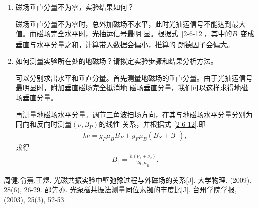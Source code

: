 \documentclass[11pt,a4paper]{article}
\begin{document}
\begin{spacing}{1.3}
\begin{CJK*}{UTF8}{gbsn}
\begin{enumerate}
\item  磁场垂直分量不为零，实验结果如何？\par 
磁场垂直分量不为零时，总外加磁场不水平，此时光抽运信号不能达到最大值。而磁场完全水平时，光抽运信号最明
显。根据式~\eqref{2-6-12}，其中的$B_{\parallel}$变成垂直与水平分量之和，计算带入数据会偏小，推算的
朗德因子会偏大。
\item  如何测量实验所在处的地磁场？请拟定实验步骤和结果分析方法。\par
可以分别求出水平和垂直分量。首先测量地磁场的垂直分量。由于光抽运信号最明显时，附加垂直磁场完全抵消地
磁场垂直分量，我们可以这样求得地磁场垂直分量。\par 
再测量地磁场水平分量。调节三角波扫场方向，在其与地磁场水平分量分别为同向和反向时测量$(\nu,B_P)$的线性
关系，并根据式~\eqref{2-6-12},即
\begin{eqnarray} 
h\nu=g_F\mu_BB_P+g_F\mu_B(B_S+B_{\parallel}),
\end{eqnarray}
求得
\begin{eqnarray} 
B_{\parallel}=\frac{h(\nu_1+\nu_2)}{2 g_F\mu_B}.
\end{eqnarray}
\end{enumerate}




\medskip
\renewcommand{\refname}{参考文献}
\begin{thebibliography}{99}
周健,俞熹,王煜. 光磁共振实验中壁弛豫过程与外磁场的关系[J]. 大学物理. (2009). 28(6), 26-29.
邵先亦. 光泵磁共振法测量同位素铷的丰度比[J]. 台州学院学报, (2003), 25(3), 52-53.
\end{thebibliography}
\end{CJK*}
%
\end{spacing}
\end{document}
